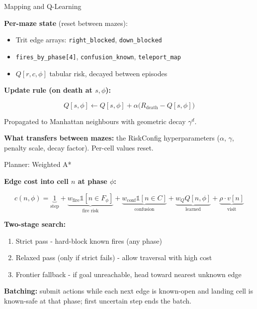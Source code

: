 \documentclass[aspectratio=169]{beamer}
\begin{document}
\begin{frame}{Mapping and Q-Learning}

\textbf{Per-maze state} (reset between mazes):
\begin{itemize}
\item Trit edge arrays: \texttt{right\_blocked}, \texttt{down\_blocked}
\item \texttt{fires\_by\_phase[4]}, \texttt{confusion\_known}, \texttt{teleport\_map}
\item $Q[r, c, \phi]$ tabular risk, decayed between episodes
\end{itemize}

\textbf{Update rule (on death at $s, \phi$):}

\[
Q[s, \phi] \leftarrow Q[s, \phi] + \alpha\bigl(R_\text{death} - Q[s, \phi]\bigr)
\]

Propagated to Manhattan neighbours with geometric decay $\gamma^{d}$.

\vspace{0.2cm}

\textbf{What transfers between mazes:} the RiskConfig hyperparameters
($\alpha$, $\gamma$, penalty scale, decay factor).  Per-cell values reset.

\end{frame}

\begin{frame}{Planner: Weighted A*}

\textbf{Edge cost into cell $n$ at phase $\phi$:}

\[
c(n, \phi) =
\underbrace{1}_{\text{step}} +
\underbrace{w_\text{fire} \mathbb{1}[n \in F_\phi]}_{\text{fire risk}} +
\underbrace{w_\text{conf} \mathbb{1}[n \in C]}_{\text{confusion}} +
\underbrace{w_Q Q[n, \phi]}_{\text{learned}} +
\underbrace{\rho \cdot v[n]}_{\text{visit}}
\]

\vspace{0.1cm}

\textbf{Two-stage search:}
\begin{enumerate}
\item Strict pass - hard-block known fires (any phase)
\item Relaxed pass (only if strict fails) - allow traversal with high cost
\item Frontier fallback - if goal unreachable, head toward nearest unknown edge
\end{enumerate}

\vspace{0.2cm}

\textbf{Batching:} submit actions while each next edge is known-open
and landing cell is known-safe at that phase; first uncertain step
ends the batch.

\end{frame}
\end{document}
